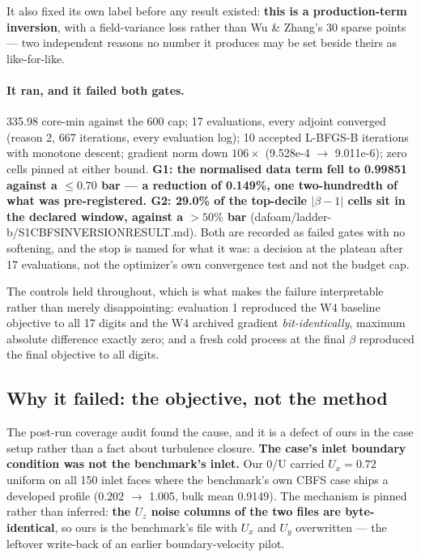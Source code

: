 \documentclass[11pt,a4paper]{article}
\newcommand{\breakus}{\textunderscore\allowbreak}
\newcommand{\code}[1]{{\small\ttfamily\let\_\breakus #1}}
\newcommand{\artifact}[1]{{\footnotesize\ttfamily\let\_\breakus #1}}
\begin{document}
It also fixed its own label before any result existed: \textbf{this is a production-term
inversion}, with a field-variance loss rather than Wu \& Zhang's 30 sparse points --- two
independent reasons no number it produces may be set beside theirs as like-for-like.

\paragraph{It ran, and it failed both gates.} 335.98 core-min against the 600 cap; 17
evaluations, every adjoint converged (reason 2, 667 iterations, every evaluation log); 10
accepted L-BFGS-B iterations with monotone descent; gradient norm down $106\times$
(9.528e-4 $\rightarrow$ 9.011e-6); zero cells pinned at either bound. \textbf{G1: the
normalised data term fell to 0.99851 against a $\leq 0.70$ bar --- a reduction of
0.149\%, one two-hundredth of what was pre-registered. G2: 29.0\% of the top-decile
$|\beta - 1|$ cells sit in the declared window, against a $>50\%$ bar}
(\artifact{dafoam/ladder-b/S1\_CBFS\_INVERSION\_RESULT.md}). Both are recorded as failed
gates with no softening, and the stop is named for what it was: a decision at the plateau
after 17 evaluations, not the optimizer's own convergence test and not the budget cap.

The controls held throughout, which is what makes the failure interpretable rather than
merely disappointing: evaluation 1 reproduced the W4 baseline objective to all 17 digits
and the W4 archived gradient \emph{bit-identically}, maximum absolute difference exactly
zero; and a fresh cold process at the final $\beta$ reproduced the final objective to all
digits.

\subsection{Why it failed: the objective, not the method}
\label{sec:s1diagnosis}

The post-run coverage audit found the cause, and it is a defect of ours in the case setup
rather than a fact about turbulence closure. \textbf{The case's inlet boundary condition
was not the benchmark's inlet.} Our \code{0/U} carried $U_x = 0.72$ uniform on all 150
inlet faces where the benchmark's own CBFS case ships a developed profile
(0.202 $\rightarrow$ 1.005, bulk mean 0.9149). The mechanism is pinned rather than
inferred: \textbf{the $U_z$ noise columns of the two files are byte-identical}, so ours is
the benchmark's file with $U_x$ and $U_y$ overwritten --- the leftover write-back of an
earlier boundary-velocity pilot.
\end{document}
